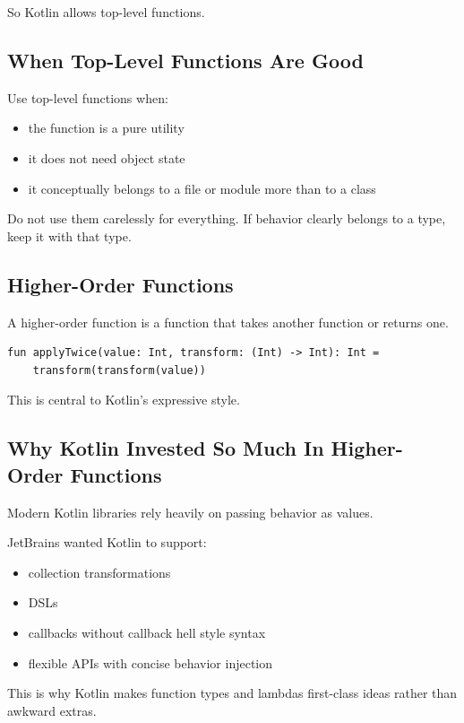 \documentclass[11pt,a4paper]{article}
\begin{document}
So Kotlin allows top-level functions.

\subsection{When Top-Level Functions Are Good}

Use top-level functions when:
\begin{itemize}
    \item the function is a pure utility
    \item it does not need object state
    \item it conceptually belongs to a file or module more than to a class
\end{itemize}

Do not use them carelessly for everything. If behavior clearly belongs to a type, keep it with that type.

\subsection{Higher-Order Functions}

A higher-order function is a function that takes another function or returns one.

\begin{lstlisting}[style=kazekotlin]
fun applyTwice(value: Int, transform: (Int) -> Int): Int =
    transform(transform(value))
\end{lstlisting}

This is central to Kotlin's expressive style.

\subsection{Why Kotlin Invested So Much In Higher-Order Functions}

Modern Kotlin libraries rely heavily on passing behavior as values.

JetBrains wanted Kotlin to support:
\begin{itemize}
    \item collection transformations
    \item DSLs
    \item callbacks without callback hell style syntax
    \item flexible APIs with concise behavior injection
\end{itemize}

This is why Kotlin makes function types and lambdas first-class ideas rather than awkward extras.
\end{document}
